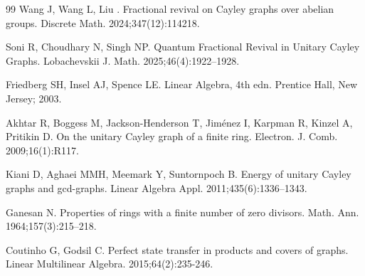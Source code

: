 \documentclass[12pt]{amsart}
\numberwithin{equation}{section}
\theoremstyle{definition}
\theoremstyle{definition} \numberwithin{equation}{section}
\begin{document}
\begin{thebibliography}{99}
 Wang J, Wang L, Liu . Fractional revival on Cayley graphs over abelian groups. Discrete Math. 2024;347(12):114218.



 Soni R, Choudhary N, Singh NP. Quantum Fractional Revival in Unitary Cayley Graphs. Lobachevskii J. Math. 2025;46(4):1922--1928.

 Friedberg SH, Insel AJ, Spence LE. Linear Algebra, 4th edn. Prentice Hall, New Jersey; 2003.


 Akhtar R, Boggess M, Jackson-Henderson T, Jim{\'e}nez I, Karpman R, Kinzel A, Pritikin D. On the unitary Cayley graph of a finite ring. Electron. J. Comb. 2009;16(1):R117.

 Kiani D, Aghaei MMH, Meemark Y, Suntornpoch B. Energy of unitary Cayley graphs and gcd-graphs. Linear Algebra Appl. 2011;435(6):1336--1343.

 Ganesan N. Properties of rings with a finite number of zero divisors. Math. Ann. 1964;157(3):215--218.

 Coutinho G, Godsil C. Perfect state transfer in products and covers of
graphs. Linear Multilinear Algebra. 2015;64(2):235-246. 


\end{thebibliography}
\end{document}
